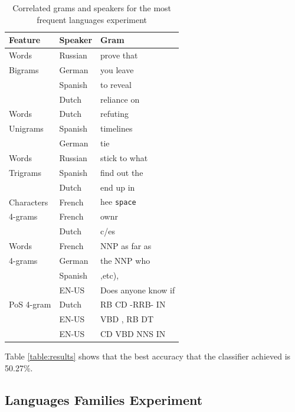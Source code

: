 \documentclass[11pt]{article}
\begin{document}
\begin{table}[htp]
\begin{tabular}{l|ll}
	Feature & Speaker  & Gram
	\\\hline
	Words & Russian &prove that\\
	 Bigrams& German& you leave\\
	 & Spanish& to reveal\\
	 & Dutch & reliance on\\\hline
	 
	Words &Dutch& refuting\\
	   Unigrams&Spanish&timelines\\
	    &German& tie\\\hline
	    
	Words 	&Russian& stick to what\\
	Trigrams&Spanish& find out the\\
	&Dutch& end up in\\\hline

	Characters &French& hee \verb+space+\\
	4-grams	&French&ownr\\
		&Dutch&c/es\\
	\hline

	Words &French& NNP as far as\\
	4-grams &German& the NNP who\\
	&Spanish& ,etc),\\
	&EN-US& Does anyone know if\\\hline
	
	PoS 4-gram &Dutch& RB CD -RRB- IN \\
	&EN-US& VBD , RB DT\\
	&EN-US& CD VBD NNS IN\\
	
\end{tabular}
\label{table:nonnative}
\caption{Correlated grams and speakers for the most frequent languages experiment}
\end{table}


Table \ref{table:results} shows that the best accuracy that the classifier achieved is 50.27\%. 

\subsection{Languages Families Experiment}
\end{document}
